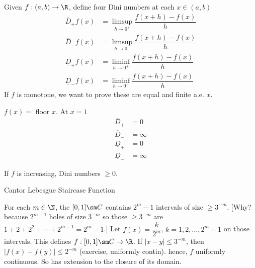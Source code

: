 Given $f: (a,b) \to \R$, define four Dini numbers at each $x \in (a,b)$
	\[
	\begin{split}
	\overline{D}_+f(x)&= \limsup_{h \to 0^+} \dfrac{f(x+h) - f(x)}{h} \\
	\overline{D}_-f(x)&= \limsup_{h \to 0^-} \dfrac{f(x+h) - f(x)}{h} \\
	\underline{D}_+f(x)&= \liminf_{h \to 0^+} \dfrac{f(x+h) - f(x)}{h} \\
	\underline{D}_-f(x)&= \liminf_{h \to 0^-} \dfrac{f(x+h) - f(x)}{h}
	\end{split}
	\]
If $f$ is monotone, we want to prove these are equal and finite a.e. $x$. 


\begin{ex}
$f(x)=$ floor $x$.
At $x=1$
	\[
	\begin{split}
	\overline{D}_+&= 0 \\
	\overline{D}_-&= \infty \\
	\underline{D}_+&= 0 \\
	\underline{D}_-&= \infty
	\end{split}
	\]
\end{ex}


If $f$ is increasing, Dini numbers $\geq 0$. 


\begin{ex}
Cantor Lebesgue Staircase Function

For each $m \in \N$, the $[0,1] \sm C$ contains $2^m-1$ intervals of size $ \geq 3^{-m}$. [Why? because $2^{m-1}$ holes of size $3^{-m}$ so those $\geq 3^{-m}$ are $1+2+2^2+\cdots+2^{m-1}= 2^m-1$.] Let $f(x)= \dfrac{k}{2^m}$, $k=1,2,\ldots,2^m-1$ on those intervals. This defines $f: [0,1] \sm C \to \R$. If $|x-y| \leq 3^{-m}$, then $|f(x)-f(y)| \leq 2^{-m}$ (exercise, uniformly contin). hence, $f$ uniformly continuous. So has extension to the closure of its domain. 
\end{ex}































